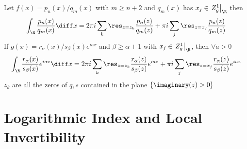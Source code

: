 \documentclass[../mmf.tex]{subfiles}
\begin{document}
\begin{thm}
	Let $f(x)=p_n(x)/q_m(x)$ with $m\ge n+2$ and $q_m(x)$ has $x_j\in \left.Z_g^1\right|_{\R}$ then
	\begin{equation}
		\int_{\R}^{}\frac{p_n(x)}{q_m(x)}\diff x=2\pi i\sum_k\res_{z=z_k}\frac{p_n(z)}{q_m(z)}+\pi i\sum_j\res_{z=x_j}\frac{p_n(z)}{q_m(z)}
		\label{eq:ratintsimple}
	\end{equation}
	If $g(x)=r_\alpha(x)/s_\beta(x)e^{iax}$ and $\beta\ge\alpha+1$ with $x_j\in\left.Z_g^1\right|_{\R}$, then $\forall a>0$
	\begin{equation}
		\int_{\R}^{}\frac{r_\alpha(x)}{s_\beta(x)}e^{iax}\diff x=2\pi i\sum_k\res_{z=z_k}\frac{r_\alpha(z)}{s_\beta(z)}e^{iaz}+\pi i\sum_j\res_{z=x_j}\frac{r_\alpha(z)}{s_\beta(z)}e^{iaz}
		\label{eq:fourierratintsimp}
	\end{equation}
	$z_k$ are all the zeros of $q,s$ contained in the plane $\{\imaginary(z)>0\}$
\end{thm}
\section{Logarithmic Index and Local Invertibility}
\end{document}
